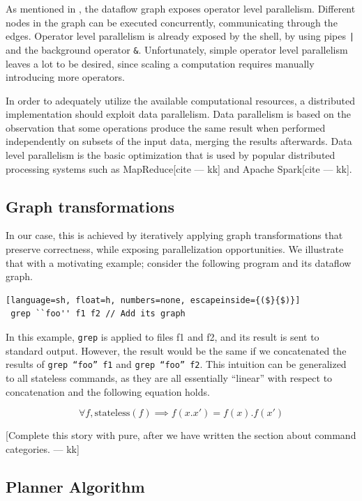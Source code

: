 \documentclass[sigplan,10pt,review,anonymous]{acmart}
\newcommand{\kk}[1]{[{\color{magenta}#1 --- kk}]}
\begin{document}
As mentioned in , the dataflow graph exposes operator level
parallelism. Different nodes in the graph can be executed
concurrently, communicating through the edges. Operator level
parallelism is already exposed by the shell, by using pipes \texttt{|}
and the background operator \texttt{\&}. Unfortunately, simple
operator level parallelism leaves a lot to be desired, since scaling a
computation requires manually introducing more operators.

In order to adequately utilize the available computational resources,
a distributed implementation should exploit data parallelism. Data
parallelism is based on the observation that some operations produce
the same result when performed independently on subsets of the input
data, merging the results afterwards. Data level parallelism is the
basic optimization that is used by popular distributed processing
systems such as MapReduce\kk{cite} and Apache Spark\kk{cite}.

\subsection{Graph transformations}

In our case, this is achieved by iteratively applying graph
transformations that preserve correctness, while exposing
parallelization opportunities. We illustrate that with a motivating
example; consider the following program and its dataflow graph.

\begin{lstlisting}[language=sh, float=h, numbers=none, escapeinside={($}{$)}]
 grep ``foo'' f1 f2 // Add its graph
\end{lstlisting}

\noindent
In this example, \texttt{grep} is applied to files f1 and f2, and its
result is sent to standard output. However, the result would be the
same if we concatenated the results of \texttt{grep ``foo'' f1} and
\texttt{grep ``foo'' f2}. This intuition can be generalized to all
stateless commands, as they are all essentially ``linear'' with
respect to concatenation and the following equation holds.

\[
\forall f, \mathrm{stateless}(f) \implies f(x.x') = f(x).f(x')
\]

\kk{Complete this story with pure, after we have written the section
  about command categories.}

\subsection{Planner Algorithm}
\end{document}
